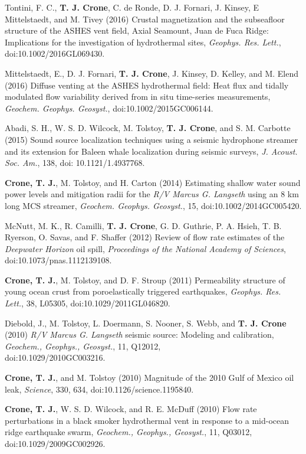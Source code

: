 \documentclass[11pt]{res}
\begin{document}
\begin{resume}
Tontini, F. C., {\bf T. J. Crone}, C. de Ronde, D. J. Fornari, J. Kinsey, E Mittelstaedt,  and M. Tivey (2016) Crustal magnetization and the subseafloor structure of the ASHES vent field, Axial Seamount, Juan de Fuca Ridge: Implications for the investigation of hydrothermal sites, {\em Geophys. Res. Lett.}, doi:10.1002/2016GL069430.

Mittelstaedt, E., D. J. Fornari, {\bf T. J. Crone}, J. Kinsey, D. Kelley, and M. Elend (2016) Diffuse venting at the ASHES hydrothermal field: Heat flux and tidally modulated flow variability derived from in situ time-series measurements, {\em Geochem. Geophys. Geosyst.}, doi:10.1002/2015GC006144.

Abadi, S. H., W. S. D. Wilcock, M. Tolstoy, {\bf T. J. Crone}, and S. M. Carbotte (2015) Sound source localization techniques using a seismic hydrophone streamer and its extension for Baleen whale localization during seismic surveys, {\em J. Acoust. Soc. Am.}, 138, doi: 10.1121/1.4937768.

{\bf Crone, T. J.}, M. Tolstoy, and H. Carton (2014) Estimating shallow water sound power levels and mitigation radii for the {\em R/V Marcus G. Langseth} using an 8 km long MCS streamer, {\em Geochem. Geophys. Geosyst.}, 15, doi:10.1002/2014GC005420.

McNutt, M. K., R. Camilli, {\bf T. J. Crone}, G. D. Guthrie, P. A. Hsieh, T. B. Ryerson, O. Savas, and F. Shaffer (2012) Review of flow rate estimates of the {\em Deepwater Horizon} oil spill, {\em Proceedings of the National Academy of Sciences}, doi:10.1073/pnas.1112139108.

{\bf Crone, T. J.}, M. Tolstoy, and D. F. Stroup (2011) Permeability structure of young ocean crust from poroelastically triggered earthquakes, {\em Geophys. Res. Lett.}, 38, L05305, doi:10.1029/2011GL046820.

Diebold, J., M. Tolstoy, L. Doermann, S. Nooner, S. Webb, and {\bf T. J. Crone} (2010) {\em R/V Marcus G. Langseth} seismic source: Modeling and calibration, {\em Geochem., Geophys., Geosyst.}, 11, Q12012,\\doi:10.1029/2010GC003216.

{\bf Crone, T. J.}, and M. Tolstoy (2010) Magnitude of the 2010 Gulf of Mexico oil leak, {\em Science}, 330, 634, doi:10.1126/science.1195840.

{\bf Crone, T. J.}, W. S. D. Wilcock, and R. E. McDuff (2010) Flow rate perturbations in a black smoker hydrothermal vent in response to a mid-ocean ridge earthquake swarm, {\em Geochem., Geophys., Geosyst.}, 11, Q03012, doi:10.1029/2009GC002926.


\end{resume}
\end{document}
